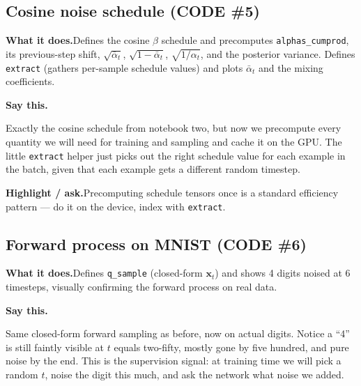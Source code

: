 \documentclass[11pt]{article}
\newenvironment{saythis}{%
  \par\smallskip\noindent
  \begin{list}{}{%
    \setlength{\leftmargin}{1.2em}%
    \setlength{\rightmargin}{0.5em}%
    \setlength{\topsep}{2pt}%
  }\item\relax
  \color{sayrule}\textbf{Say this.}\hspace{0.4em}\color{black}\itshape
}{%
  \end{list}\par\smallskip
}
\newcommand{\highlight}[1]{\par\smallskip\noindent\textcolor{hlcolor}{\textbf{Highlight / ask.}}\hspace{0.4em}#1\par\smallskip}
\newcommand{\whatdoes}[1]{\par\noindent\textbf{What it does.}\hspace{0.4em}#1\par}
\begin{document}
\subsection{Cosine noise schedule (CODE \#5)}
\whatdoes{Defines the cosine $\beta$ schedule and precomputes \texttt{alphas\_cumprod}, its previous-step
shift, $\sqrt{\bar\alpha_t}$, $\sqrt{1-\bar\alpha_t}$, $\sqrt{1/\alpha_t}$, and the posterior variance.
Defines \texttt{extract} (gathers per-sample schedule values) and plots $\bar\alpha_t$ and the mixing
coefficients.}
\begin{saythis}
Exactly the cosine schedule from notebook two, but now we precompute every quantity we will need for
training and sampling and cache it on the GPU. The little \texttt{extract} helper just picks out the
right schedule value for each example in the batch, given that each example gets a different random
timestep.
\end{saythis}
\highlight{Precomputing schedule tensors once is a standard efficiency pattern --- do it on the device,
index with \texttt{extract}.}

\subsection{Forward process on MNIST (CODE \#6)}
\whatdoes{Defines \texttt{q\_sample} (closed-form $\mathbf{x}_t$) and shows 4 digits noised at 6 timesteps,
visually confirming the forward process on real data.}
\begin{saythis}
Same closed-form forward sampling as before, now on actual digits. Notice a ``4'' is still faintly
visible at $t$ equals two-fifty, mostly gone by five hundred, and pure noise by the end. This is the
supervision signal: at training time we will pick a random $t$, noise the digit this much, and ask the
network what noise we added.
\end{saythis}
\end{document}
